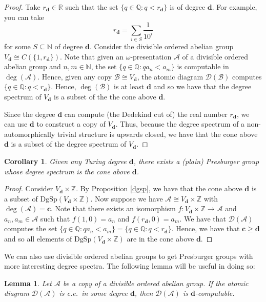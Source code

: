 \documentclass{amsart}%
\numberwithin{theorem}{section}
\newtheorem{corollary}[theorem]{Corollary}
\newtheorem{lemma}[theorem]{Lemma}
\newcommand{\Q}{\mathbb{Q}}
\newcommand{\R}{\mathbb{R}}
\newcommand{\Z}{\mathbb{Z}}
\newcommand{\N}{\mathbb{N}}
\newcommand{\A}{\mathcal{A}}
\newcommand{\B}{\mathcal{B}}
\newcommand{\D}{\mathcal{D}}
\newcommand{\0}{\emptyset}
\newcommand{\ccc}{\boldsymbol{c}}
\newcommand{\ddd}{\boldsymbol{d}}
\newcommand{\dgsp}{\text{DgSp}}
\begin{document}
\begin{proof}
Take $r_{\ddd} \in \R$ such that the set $\{q\in \Q: q<r_{\ddd}\}$ is of degree $\ddd$. For example, you can take $$r_{\ddd} =\sum_{i\in S} \frac{1}{10^i} $$ for some $S\subseteq \N$ of degree $\ddd$. Consider the divisible ordered abelian group $V_{\ddd} \cong C(\{1,r_{\ddd}\})$. Note that given an $\omega$-presentation $\A$ of a divisible ordered abelian group and $n,m\in \N$, the set $\{q\in \Q: qa_n<a_m\}$ is computable in $\deg(\A)$. Hence, given any copy $\B\cong V_{\ddd}
$, the atomic diagram $\D(\B)$ computes $\{q\in \Q: q<r_{\ddd}\}$. Hence, $\deg(\B)$ is at least $\ddd$ and so we have that the degree spectrum of $V_{\ddd}$  is a subset of the the cone above $\ddd$.

Since the degree $\ddd$ can compute (the Dedekind cut of) the real number $r_{\ddd}$, we can use $\ddd$ to construct a copy of $V_{\ddd}$. Thus, because the degree spectrum of a non-automorphically trivial structure is upwards closed, we have that the cone above $\ddd$ is a subset of the degree spectrum of $V_{\ddd}$. 
\end{proof}

\begin{corollary}
\label{upper cone cor}
Given any Turing degree $\ddd$, there exists a (plain) Presburger group whose degree spectrum is the cone above $\ddd$. 
\end{corollary}

\begin{proof}
Consider $V_{\ddd}\times \Z$. By Proposition \ref{dgsp}, we have that the cone above $\ddd$ is a subset of $\dgsp(V_{\ddd}\times \Z)$. Now suppose we have $\A\cong V_{\ddd}\times \Z$ with $\deg(\A)=\ccc.$ Note that there exists an isomorphism $f:V_{\ddd}\times \Z\to \A$ and $a_n,a_m\in \A$ such that $f(1,0)=a_n$ and $f(r_{\ddd},0)=a_m$. We have that $\D(\A)$ computes the set $\{q\in \Q: qa_n<a_m\}=\{q\in \Q:q<r_{\ddd}\}$. Hence, we have that $\ccc\geq \ddd$ and so all elements of $\dgsp(V_{\ddd}\times \Z)$ are in the cone above $\ddd$. 
\end{proof}

We can also use divisible ordered abelian groups to get Presburger groups with more interesting degree spectra. The following lemma will be useful in doing so:

\begin{lemma}
\label{c.e. in}
Let $\A$ be a copy of a divisible ordered abelian group.  If the atomic diagram $\D(\A)$ is c.e.\ in some degree $\ddd$, then $\D(\A)$ is $\ddd$-computable.    
\end{lemma}
\end{document}
